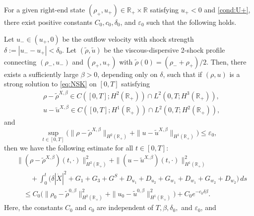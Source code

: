 \documentclass[10pt,a4paper]{amsart}
\newcommand{\e}{\varepsilon}
\begin{document}
\begin{proposition}\label{prop:apriori}

    For a given right-end state $(\rho_+, u_+) \in \mathbb{R}_+ \times \mathbb{R}$ satisfying $u_+<0$ and \eqref{cond:U+}, there exist positive constants $C_0, c_0, \delta_0$, and $\e_0$ such that the following holds.
    
    Let $u_- \in (u_+, 0)$ be the outflow velocity with shock strength $\delta := |u_- - u_+| < \delta_0$. Let $(\tilde{\rho}, \tilde{u})$ be the viscous-dispersive 2-shock profile connecting $(\rho_-, u_-)$ and $(\rho_+, u_+)$ with $\tilde{\rho}(0) = (\rho_- + \rho_+)/2$. Then, there exists a sufficiently large $\beta>0$, depending only on $\delta$, such that if $(\rho, u)$ is a strong solution to \eqref{eq:NSK} on $[0,T]$ satisfying
    \begin{equation*}
    \begin{aligned}
    &\rho - \tilde{\rho}^{X, \beta} \in C([0,T];H^2(\mathbb{R}_+)) \cap L^2(0,T;H^3(\mathbb{R}_+)),\\
    &u - \tilde{u}^{X, \beta} \in C([0,T];H^1(\mathbb{R}_+)) \cap L^2(0,T;H^2(\mathbb{R}_+)),
    \end{aligned} 
    \end{equation*}
    and
    \begin{equation}\label{p-assum}
    \sup_{t \in [0,T]} \Big( \| \rho - \tilde{\rho}^{X, \beta} \|_{H^2(\mathbb{R}_+)} + \| u - \tilde{u}^{X, \beta} \|_{H^1(\mathbb{R}_+)} \Big) \leq \e_0,
    \end{equation}
    then we have the following estimate for all $t \in [0, T]$:
    \begin{equation*}%
    \begin{aligned}
    & \|(\rho - \tilde{\rho}^{X, \beta})(t,\cdot
    )\|_{H^2(\mathbb{R}_+)}^2 + \| (u - \tilde{u}^{X, \beta})(t,\cdot) \|_{H^1(\mathbb{R}_+)}^2 \\
    &\qquad + \int_0^t \Big( \delta |\dot{X}|^2 + G_1 + G_3 + G^S + D_{u_1} + D_{u_2} + G_{w_1} + D_{w_1} + G_{w_2} + D_{w_2} \Big)\,ds\\
    &\quad \leq C_0 \Big( \| \rho_0 - \tilde{\rho}^{0,\beta} \|_{H^2(\mathbb{R}_+)}^2 + \| u_0 - \tilde{u}^{0,\beta} \|_{H^1(\mathbb{R}_+)}^2 \Big) + C_0 e^{-c_0 \delta \beta}.
    \end{aligned} 
    \end{equation*}
    Here, the constants $C_0$ and $c_0$ are independent of $T, \beta, \delta_0,$ and $\varepsilon_0$, and
    \begin{equation}\label{terms}

\end{equation}
\end{proposition}
\end{document}
